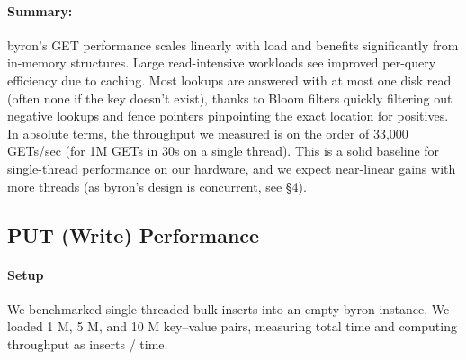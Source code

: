 \documentclass[10pt]{article}
\begin{document}
\paragraph{Summary:} byron’s GET performance scales linearly with load and benefits significantly from in-memory structures. Large read-intensive workloads see improved per-query efficiency due to caching. Most lookups are answered with at most one disk read (often none if the key doesn’t exist), thanks to Bloom filters quickly filtering out negative lookups and fence pointers pinpointing the exact location for positives. In absolute terms, the throughput we measured is on the order of 33,000 GETs/sec (for 1M GETs in 30s on a single thread). This is a solid baseline for single-thread performance on our hardware, and we expect near-linear gains with more threads (as byron’s design is concurrent, see §4).

\subsection{PUT (Write) Performance}

\paragraph{Setup}
We benchmarked single-threaded bulk inserts into an empty byron instance.
We loaded 1 M, 5 M, and 10 M key–value pairs, measuring total time and computing throughput as inserts / time.
\end{document}
